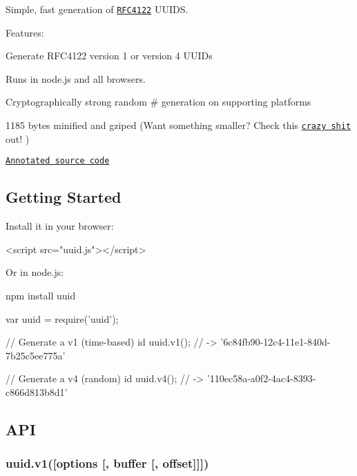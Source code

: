 \href{https://ci.testling.com/defunctzombie/node-uuid}{\tt }

Simple, fast generation of \href{http://www.ietf.org/rfc/rfc4122.txt}{\tt R\+F\+C4122} U\+U\+I\+DS.

Features\+:


\begin{DoxyItemize}
\item Generate R\+F\+C4122 version 1 or version 4 U\+U\+I\+Ds
\item Runs in node.\+js and all browsers.
\item Cryptographically strong random \# generation on supporting platforms
\item 1185 bytes minified and gzip\textquotesingle{}ed (Want something smaller? Check this \href{https://gist.github.com/982883}{\tt crazy shit} out! )
\item \href{http://broofa.github.com/node-uuid/docs/uuid.html}{\tt Annotated source code}
\end{DoxyItemize}

\subsection*{Getting Started}

Install it in your browser\+:


\begin{DoxyCode}
<script src="uuid.js"></script>
\end{DoxyCode}


Or in node.\+js\+:


\begin{DoxyCode}
npm install uuid
\end{DoxyCode}



\begin{DoxyCode}
var uuid = require('uuid');

// Generate a v1 (time-based) id
uuid.v1(); // -> '6c84fb90-12c4-11e1-840d-7b25c5ee775a'

// Generate a v4 (random) id
uuid.v4(); // -> '110ec58a-a0f2-4ac4-8393-c866d813b8d1'
\end{DoxyCode}


\subsection*{A\+PI}

\subsubsection*{uuid.\+v1(\mbox{[}{\ttfamily options} \mbox{[}, {\ttfamily buffer} \mbox{[}, {\ttfamily offset}\mbox{]}\mbox{]}\mbox{]})}

